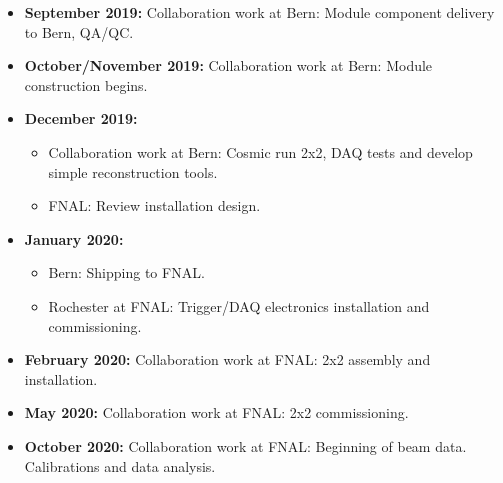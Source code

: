 \begin{itemize}
\item {\bf September 2019:} Collaboration work at Bern: Module component delivery to Bern, QA/QC.
\item {\bf October/November 2019:} Collaboration work at Bern: Module construction begins.
\item {\bf December 2019:} 
\begin{itemize}
	\item Collaboration work at Bern: Cosmic run  2x2, DAQ tests and develop simple reconstruction tools.   
	\item FNAL: Review installation design.  
\end{itemize}
\item {\bf January 2020:}
\begin{itemize}
	\item Bern: Shipping to FNAL.
	\item Rochester at FNAL: Trigger/DAQ electronics installation and commissioning. 
\end{itemize}
\item {\bf February 2020:} Collaboration work at FNAL: 2x2 assembly and installation.
\item {\bf May 2020:} Collaboration work at FNAL: 2x2 commissioning.    
\item {\bf October 2020:} Collaboration work at FNAL: Beginning of beam data. Calibrations and data analysis.

\end{itemize}

